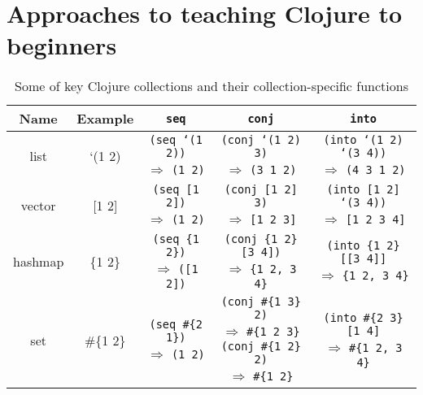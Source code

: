 \documentclass[submission,copyright,creativecommons]{eptcs}
\newcommand{\allcomments}[1]{{#1}}
\newcommand{\todo}[1]{{\bf \color{magenta}{\allcomments{ To-do: {#1}}}}}
\begin{document}

\section{Approaches to teaching Clojure to beginners}\label{sec:approaches}
\begin{table}[t]
\centering
\begin{tabular}{|c|c|c|c|c|}
\hline
Name & Example & {\tt seq} & {\tt conj} &  {\tt into}  \\
\hline
list & `(1 2) & {\parbox{3cm}{{\tt (seq `(1 2))} \\ $\Rightarrow$ {\tt (1 2)}}} &
{\parbox{3.5cm}{{\tt (conj `(1 2) 3)} \\ $\Rightarrow$ {\tt (3 1 2)}}} & 
{\parbox{4.2cm}{{\tt (into `(1 2) `(3 4))} \\ $\Rightarrow$ {\tt (4 3 1 2)}}} 
\\
\hline
vector & [1 2] & 
{\parbox{3cm}{{\tt (seq [1 2])} \\ $\Rightarrow$ {\tt (1 2)}}} &
{\parbox{3.5cm}{{\tt (conj [1 2] 3)} \\ $\Rightarrow$ {\tt [1 2 3]}}} & 
{\parbox{4.2cm}{{\tt (into [1 2] `(3 4))} \\ $\Rightarrow$ {\tt [1 2 3 4]}}} 
 \\
\hline
hashmap & \{1 2\} & 
{\parbox{3cm}{{\tt (seq \{1 2\})} \\ $\Rightarrow$ {\tt ([1 2])}}} &
{\parbox{3.5cm}{{\tt (conj \{1 2\} [3 4])} \\ $\Rightarrow$ {\tt \{1 2, 3 4\}}}} & 
{\parbox{4.2cm}{{\tt (into \{1 2\} [[3 4]]} \\ $\Rightarrow$ {\tt \{1 2, 3 4\}}}} 
 \\
\hline
set & \#\{1 2\} & 
{\parbox{3cm}{{\tt (seq \#\{2 1\})} \\ $\Rightarrow$ {\tt (1 2)}}} &
{\parbox{3.5cm}{{\tt (conj \#\{1 3\} 2)} \\ $\Rightarrow$ {\tt \#\{1 2 3\}}
\\ {\tt (conj \#\{1 2\} 2)} \\ $\Rightarrow$ {\tt \#\{1 2\}}}} & 
{\parbox{4.2cm}{{\tt (into \#\{2 3\} [1 4]} \\ $\Rightarrow$ {\tt \#\{1 2, 3 4\}}}} 
 \\
\hline
\end{tabular}
\caption{Some of key Clojure collections and their collection-specific functions}\label{table:coll}
\end{table}
\end{document}
